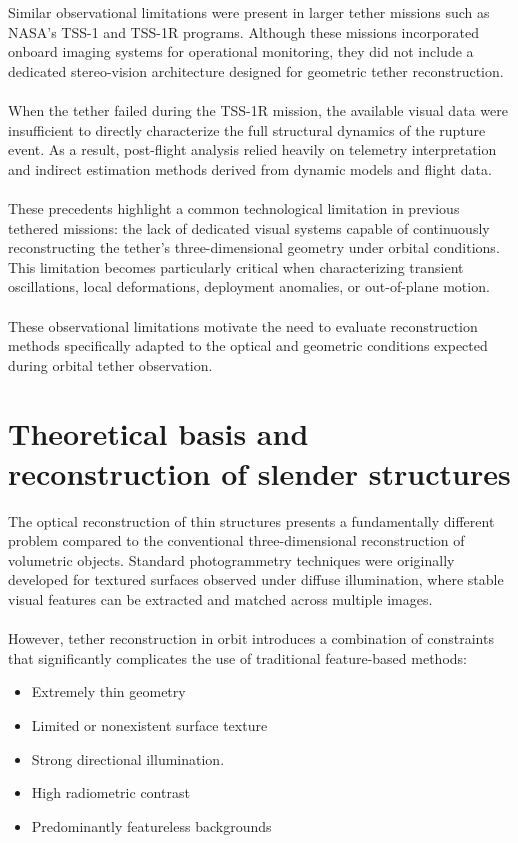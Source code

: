 Similar observational limitations were present in larger tether missions such as NASA's TSS-1 and TSS-1R programs. Although these missions incorporated onboard imaging systems for operational monitoring, they did not include a dedicated stereo-vision architecture designed for geometric tether reconstruction.
\\\\
When the tether failed during the TSS-1R mission, the available visual data were insufficient to directly characterize the full structural dynamics of the rupture event. As a result, post-flight analysis relied heavily on telemetry interpretation and indirect estimation methods derived from dynamic models and flight data.
\\\\
These precedents highlight a common technological limitation in previous tethered missions: the lack of dedicated visual systems capable of continuously reconstructing the tether's three-dimensional geometry under orbital conditions. This limitation becomes particularly critical when characterizing transient oscillations, local deformations, deployment anomalies, or out-of-plane motion.
\\\\
These observational limitations motivate the need to evaluate reconstruction methods specifically adapted to the optical and geometric conditions expected during orbital tether observation.

\section{Theoretical basis and reconstruction of slender structures}

The optical reconstruction of thin structures presents a fundamentally different problem compared to the conventional three-dimensional reconstruction of volumetric objects. Standard photogrammetry techniques were originally developed for textured surfaces observed under diffuse illumination, where stable visual features can be extracted and matched across multiple images.
\\\\
However, tether reconstruction in orbit introduces a combination of constraints that significantly complicates the use of traditional feature-based methods:

\begin{itemize}
    \item Extremely thin geometry
    \item Limited or nonexistent surface texture
    \item Strong directional illumination.
    \item High radiometric contrast
    \item Predominantly featureless backgrounds
\end{itemize}


